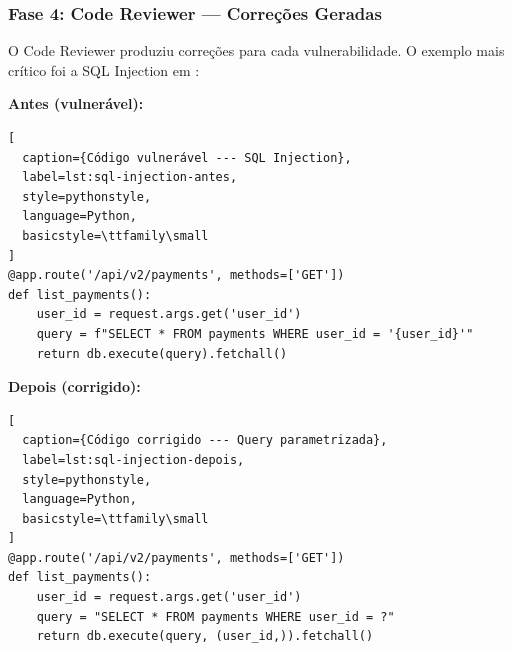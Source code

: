\begin{table}[htb]
\centering
\caption{Vulnerabilidades detectadas pelo Security Auditor}
\label{tab:vulnerabilidades}
\small
\end{table}

\subsubsection{Fase 4: Code Reviewer --- Correções Geradas}

O Code Reviewer produziu correções para cada vulnerabilidade. O
exemplo mais crítico foi a SQL Injection em :

\textbf{Antes (vulnerável):}

\begin{lstlisting}[
  caption={Código vulnerável --- SQL Injection},
  label=lst:sql-injection-antes,
  style=pythonstyle,
  language=Python,
  basicstyle=\ttfamily\small
]
@app.route('/api/v2/payments', methods=['GET'])
def list_payments():
    user_id = request.args.get('user_id')
    query = f"SELECT * FROM payments WHERE user_id = '{user_id}'"
    return db.execute(query).fetchall()
\end{lstlisting}

\textbf{Depois (corrigido):}

\begin{lstlisting}[
  caption={Código corrigido --- Query parametrizada},
  label=lst:sql-injection-depois,
  style=pythonstyle,
  language=Python,
  basicstyle=\ttfamily\small
]
@app.route('/api/v2/payments', methods=['GET'])
def list_payments():
    user_id = request.args.get('user_id')
    query = "SELECT * FROM payments WHERE user_id = ?"
    return db.execute(query, (user_id,)).fetchall()
\end{lstlisting}

